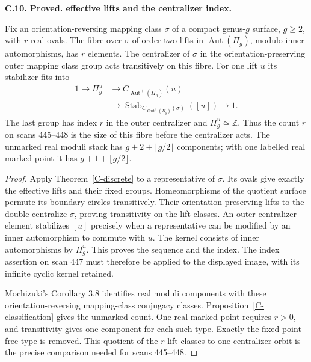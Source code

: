 \documentclass[11pt,oneside]{article}
\makeatletter
\newcounter{statementanchor}
\newenvironment{statement}[3]{%
 \refstepcounter{statementanchor}\def\@currentlabel{#1}%
 \par\addvspace{9pt}\noindent
 \textbf{#1. #2. #3.}\par\nobreak\noindent\ignorespaces
}{\par\addvspace{5pt}}
\makeatother
\begin{document}
\begin{statement}{C.10}{Proved}{effective lifts and the centralizer index}
\label{st:C.10}
\label{C-moduli-count}
Fix an orientation-reversing mapping class $\sigma$
of a compact genus-$g$ surface, $g\geq2$, with
$r$ real ovals. The fibre over $\sigma$ of
order-two lifts in $\operatorname{Aut}(\Pi_g)$,
modulo inner automorphisms, has $r$ elements.
The centralizer of $\sigma$ in the
orientation-preserving outer mapping class
group acts transitively on this fibre.
For one lift $u$ its stabilizer fits into
\[
\begin{split}
 1\longrightarrow\Pi_g^u
 &\longrightarrow C_{\operatorname{Aut}^{+}(\Pi_g)}(u)\\
 &\longrightarrow
 \operatorname{Stab}_{C_{\operatorname{Out}^{+}(\Pi_g)}(\sigma)}
       ([u])\longrightarrow1.
\end{split}
\]
The last group has index $r$ in the outer centralizer
and $\Pi_g^u\simeq\mathbb Z$.
Thus the count $r$ on scans 445--448 is the size of
this fibre before the centralizer acts.
The unmarked real moduli stack has
$g+2+\lfloor g/2\rfloor$ components; with one
labelled real marked point it has
$g+1+\lfloor g/2\rfloor$.
\end{statement}
\begin{proof}
Apply Theorem~\ref{C-discrete} to a representative
of $\sigma$. Its ovals give exactly the effective
lifts and their fixed groups. Homeomorphisms of the
quotient surface permute its boundary circles
transitively. Their orientation-preserving lifts
to the double centralize $\sigma$, proving
transitivity on the lift classes.
An outer centralizer element stabilizes $[u]$
precisely when a representative can be modified
by an inner automorphism to commute with $u$.
The kernel consists of inner automorphisms by
$\Pi_g^u$. This proves the sequence and the
index. The index assertion on scan 447 must
therefore be applied to the displayed image,
with its infinite cyclic kernel retained.

Mochizuki's Corollary 3.8 identifies real moduli
components with these orientation-reversing
mapping-class conjugacy classes.
Proposition~\ref{C-classification} gives the
unmarked count. One real marked point requires
$r>0$, and transitivity gives one component
for each such type. Exactly the fixed-point-free
type is removed. This quotient of the $r$ lift
classes to one centralizer orbit is the
precise comparison needed for scans 445--448.
\end{proof}
\end{document}
